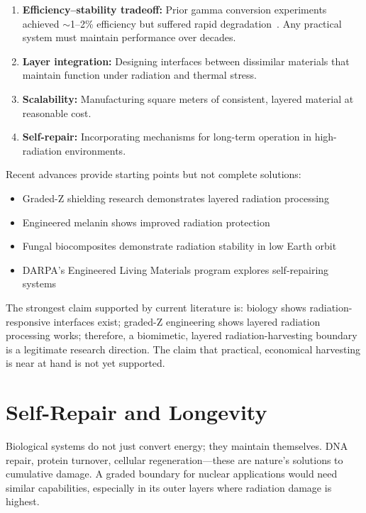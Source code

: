 \documentclass[12pt]{article}
\begin{document}
\begin{enumerate}
    \item \textbf{Efficiency--stability tradeoff:} Prior gamma conversion experiments
    achieved $\sim$1--2\% efficiency but suffered rapid degradation~\cite{tanabe2010}.
    Any practical system must maintain performance over decades.

    \item \textbf{Layer integration:} Designing interfaces between dissimilar materials
    that maintain function under radiation and thermal stress.

    \item \textbf{Scalability:} Manufacturing square meters of consistent, layered
    material at reasonable cost.

    \item \textbf{Self-repair:} Incorporating mechanisms for long-term operation in
    high-radiation environments.
\end{enumerate}

Recent advances provide starting points but not complete solutions:
\begin{itemize}
    \item Graded-Z shielding research demonstrates layered radiation processing~\cite{atwell2013}
    \item Engineered melanin shows improved radiation protection~\cite{deng2025}
    \item Fungal biocomposites demonstrate radiation stability in low Earth orbit~\cite{casadevall2025}
    \item DARPA's Engineered Living Materials program explores self-repairing systems~\cite{darpa2025}
\end{itemize}

The strongest claim supported by current literature is: biology shows radiation-responsive
interfaces exist; graded-Z engineering shows layered radiation processing works;
therefore, a biomimetic, layered radiation-harvesting boundary is a legitimate research
direction. The claim that practical, economical harvesting is near at hand is not yet
supported.

\section{Self-Repair and Longevity}

Biological systems do not just convert energy; they maintain themselves. DNA repair,
protein turnover, cellular regeneration---these are nature's solutions to cumulative
damage. A graded boundary for nuclear applications would need similar capabilities,
especially in its outer layers where radiation damage is highest.
\end{document}
